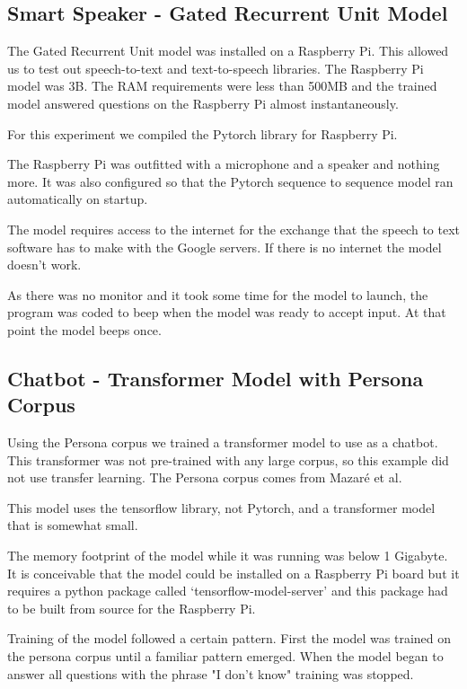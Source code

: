 \subsection{Smart Speaker - Gated Recurrent Unit Model}

The Gated Recurrent Unit model was installed on a Raspberry Pi. This allowed us to test out speech-to-text and text-to-speech libraries. The Raspberry Pi model was 3B. The RAM requirements were less than 500MB and the trained model answered questions on the Raspberry Pi almost instantaneously.

For this experiment we compiled the Pytorch library for Raspberry Pi.

The Raspberry Pi was outfitted with a microphone and a speaker and nothing more. It was also configured so that the Pytorch sequence to sequence model ran automatically on startup.

The model requires access to the internet for the exchange that the speech to text software has to make with the Google servers. If there is no internet the model doesn't work.

As there was no monitor and it took some time for the model to launch, the program was coded to beep when the model was ready to accept input. At that point the model beeps once.

\subsection{Chatbot - Transformer Model with Persona Corpus}
Using the Persona corpus we trained a transformer model to use as a chatbot. This transformer was not pre-trained with any large corpus, so this example did not use transfer learning. The Persona corpus comes from Mazar{\'{e}} et al\cite{DBLP:journals/corr/abs-1809-01984}.

This model uses the tensorflow library, not Pytorch, and a transformer model that is somewhat small.

The memory footprint of the model while it was running was below 1 Gigabyte. It is conceivable that the model could be installed on a Raspberry Pi board but it requires a python package called `tensorflow-model-server' and this package had to be built from source for the Raspberry Pi. 

Training of the model followed a certain pattern. First the model was trained on the persona corpus until a familiar pattern emerged. When the model began to answer all questions with the 
phrase "I don't know" training was stopped. 

